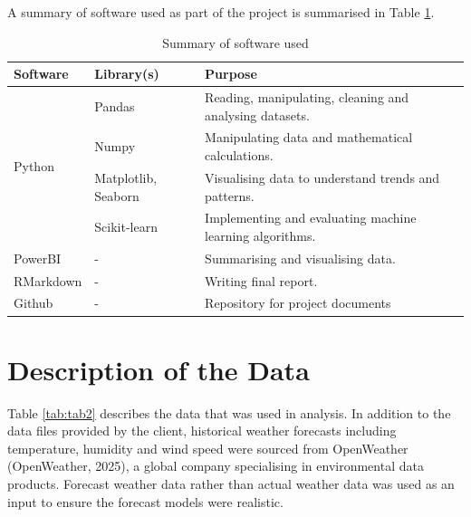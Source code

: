 \documentclass[mstat,12pt]{unswthesis}
\begin{document}
A summary of software used as part of the project is summarised in Table \ref{tab:tab1}.
\bigskip

\begin{table}[H]
\caption{Summary of software used}
\begin{center}
\begin{tabular}{|l|l|p{19em}|}
\hline
\textbf{Software} & \textbf{Library(s)} & \textbf{Purpose} \\
\hline
\multirow{4}{4em}{Python} & Pandas & Reading, manipulating, cleaning and analysing datasets. \\
\cline{2-3}
& Numpy & Manipulating data and mathematical \newline calculations. \\
\cline{2-3}
& Matplotlib, Seaborn & Visualising data to understand trends and \newline patterns. \\
\cline{2-3}
& Scikit-learn & Implementing and evaluating machine learning algorithms. \\
\hline
PowerBI & - & Summarising and visualising data. \\
\hline
RMarkdown & - & Writing final report. \\
\hline
Github & - & Repository for project documents \\
\hline
\end{tabular}
\end{center}
\label{tab:tab1}
\end{table}

\section{Description of the Data}\label{description-of-the-data}

Table \ref{tab:tab2} describes the data that was used in analysis. In addition to the data files provided by the client, historical weather forecasts including temperature, humidity and wind speed were sourced from OpenWeather (OpenWeather, 2025), a global company specialising in environmental data products. Forecast weather data rather than actual weather data was used as an input to ensure the forecast models were realistic.
\end{document}
